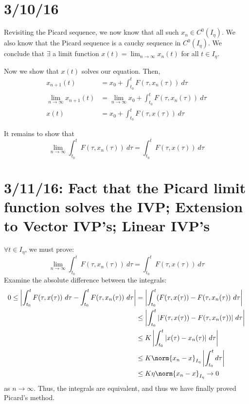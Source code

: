 \documentclass[12pt]{article}
\begin{document}
\section{3/10/16}

Revisiting the Picard sequence, we now know that all such $x_n \in C^0(I_{\eta})$. We also know that the Picard sequence is a cauchy sequence in $C^0(I_{\eta})$. We conclude that $\exists$ a limit function $x(t) = \displaystyle\lim_{n \to \infty}x_n(t)$ for all $t \in I_{\eta}$. 

Now we show that $x(t)$ solves our equation. 
Then, \[ 
\begin{aligned}
x_{n+1}(t) &= x_0 + \int_{t_0}^t F(\tau, x_n(\tau)) \ d\tau \\
\lim_{n \to \infty} x_{n+1}(t) &= \lim_{n \to \infty}x_0 + \int_{t_0}^t F(\tau, x_n(\tau)) \ d\tau \\
x(t) &= x_0 + \int_{t_0}^t F(\tau,x(\tau)) \ d\tau
\end{aligned}
\]

It remains to show that \[ \lim_{n \to \infty}\int_{t_0}^t F(\tau, x_n(\tau)) \ d\tau = \int_{t_0}^t F(\tau,x(\tau)) \ d\tau \]

\section{3/11/16: Fact that the Picard limit function solves the IVP; Extension to Vector IVP's; Linear IVP's}
$\forall t \in I_{\eta}$, we must prove: 
\[ \lim_{n \to \infty}\int_{t_0}^t F(\tau, x_n(\tau)) \ d\tau = \int_{t_0}^t F(\tau,x(\tau)) \ d\tau \]
Examine the absolute difference between the integrals:
\[
\begin{aligned}
0 \le \left| \int_{t_0}^tF(\tau,x(\tau)) \ d\tau - \int_{t_0}^t F(\tau,x_n(\tau)) \ d\tau \right| &= \left| \int_{t_0}^t(F(\tau,x(\tau)) - F(\tau,x_n(\tau)) \ d\tau \right| \\
&\le \left| \int_{t_0}^t |F(\tau,x(\tau)) - F(\tau, x_n(\tau))| \ d\tau \right| \\
&\le K\left|\int_{t_0}^t|x(\tau) - x_n(\tau)| \ d\tau\right| \\
&\le K\norm{x_n - x}_{I_{\eta}}\left| \int_{t_0}^td\tau \right| \\
&\le K\eta\norm{x_n - x}_{I_{\eta}} \to 0
\end{aligned}
\]
as $n \to \infty$. Thus, the integrals are equivalent, and thus we have finally proved Picard's method.
\end{document}
